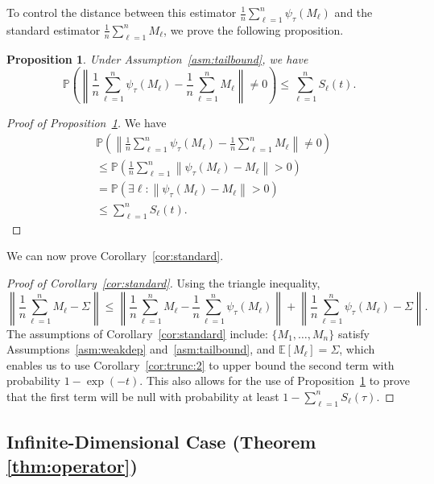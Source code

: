 \documentclass[11pt,a4paper]{article}
\newtheorem{proposition}[theorem]{Proposition}
\theoremstyle{remark}
\theoremstyle{definition}
\theoremstyle{definition}
\newcommand{\Surv}{S}
\begin{document}
\begin{bibunit}[apalike]
To control the distance between this estimator $\frac{1}{n}\sum_{\ell=1}^{n} \psi_\tau(M_{\ell})$ and the standard estimator $\frac{1}{n}\sum_{\ell=1}^{n} M_\ell$, we prove the following proposition.
 \begin{proposition}
 \label{prop:trunc:estimator}
 Under Assumption~\ref{asm:tailbound}, we have
 $$ \mathbb{P}\left( \left\| \frac{1}{n}\sum_{\ell=1}^n \psi_\tau(M_\ell) - \frac{1}{n}\sum_{\ell=1}^n M_\ell \right\| \neq 0 \right) \leq \sum_{\ell=1}^n \Surv_\ell(t) .$$
 \end{proposition}
\begin{proof}[Proof of Proposition~\ref{prop:trunc:estimator}]
We have
\begin{align*}
    &\mathbb{P}\left( \left\| \frac{1}{n}\sum_{\ell=1}^n \psi_\tau(M_\ell) - \frac{1}{n}\sum_{\ell=1}^n M_\ell \right\| \neq 0 \right)
    \\&
    \leq
        \mathbb{P}\left(  \frac{1}{n}\sum_{\ell=1}^n\left\| \psi_\tau(M_\ell) - M_\ell \right\| > 0 \right)
    \\
& = \mathbb{P}\left( \exists \ell: \left\| \psi_\tau(M_\ell) - M_\ell \right\| > 0 \right)
\\
& \leq \sum_{\ell=1}^n \Surv_\ell(t).
\end{align*}
\end{proof}
We can now prove Corollary~\ref{cor:standard}.
\begin{proof}[Proof of Corollary~\ref{cor:standard}]
Using the triangle inequality,
$$
 \left\|\frac{1}{n}\sum_{\ell=1}^{n} M_{\ell}-\Sigma\right\|
 \leq  \left\|\frac{1}{n}\sum_{\ell=1}^{n} M_\ell - \frac{1}{n}\sum_{\ell=1}^{n} \psi_\tau(M_\ell) \right\| +  \left\|\frac{1}{n}\sum_{\ell=1}^{n} \psi_\tau(M_{\ell}) - \Sigma \right\|.
$$
The assumptions of Corollary~\ref{cor:standard} include: $\{M_1,\dots,M_n\}$ satisfy Assumptions~\ref{asm:weakdep} and~\ref{asm:tailbound}, and $\mathbb{E}[M_\ell]=\Sigma$, which enables us to use Corollary~\ref{cor:trunc:2} to upper bound the second term with probability $1-\exp(-t)$. This also allows for the use of Proposition~\ref{prop:trunc:estimator} to prove that the first term will be null with probability at least $1-\sum_{\ell=1}^n \Surv_\ell(\tau)$.
\end{proof}

\subsection{Infinite-Dimensional Case (Theorem \ref{thm:operator})}



\end{bibunit}
\end{document}
